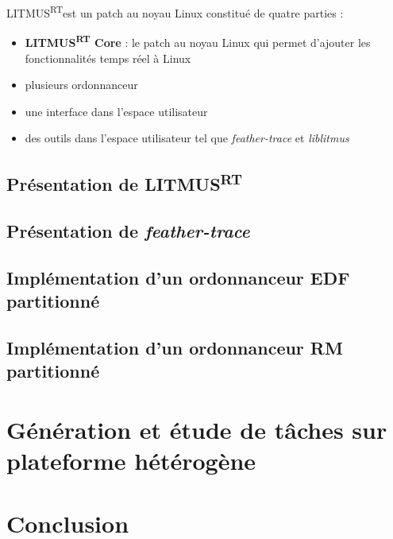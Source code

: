 \documentclass{article}
\newcommand{\litmus}{LITMUS\textsuperscript{RT}}
\begin{document}
    \litmus est un patch au noyau Linux constitué de quatre parties : 
    \begin{itemize}
        \item \textbf{LITMUS\textsuperscript{RT} Core} : le patch au noyau Linux qui permet d'ajouter les fonctionnalités temps réel à Linux
        \item plusieurs \gls{ordonnanceur}
        \item une interface dans l'espace utilisateur
        \item des outils dans l'espace utilisateur tel que \textit{feather-trace} et \textit{liblitmus}
    \end{itemize}


    \subsection{Présentation de \litmus}
    
    
    
    \subsection{Présentation de \textit{feather-trace}}
    


    \subsection{Implémentation d'un ordonnanceur EDF partitionné}
    
    
    
    \subsection{Implémentation d'un ordonnanceur RM partitionné}

    
    
    
    \newpage
    \section[Génération de tâches]{Génération et étude de tâches sur plateforme hétérogène}

    


    \newpage
    \section*{Conclusion}
\end{document}
